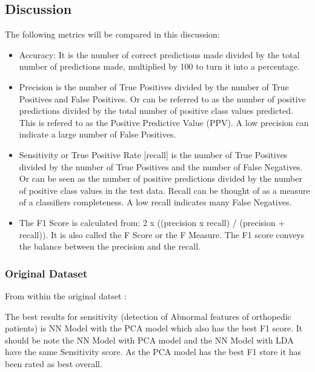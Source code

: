 \documentclass[
]{article}
\begin{document}
\newpage

\hypertarget{discussion}{%
\subsection{Discussion}\label{discussion}}

The following metrics will be compared in this discussion:

\begin{itemize}
\item
  Accuracy: It is the number of correct predictions made divided by the
  total number of predictions made, multiplied by 100 to turn it into a
  percentage.
\item
  Precision is the number of True Positives divided by the number of
  True Positives and False Positives. Or can be referred to as the
  number of positive predictions divided by the total number of positive
  class values predicted. This is refered to as the Positive Predictive
  Value (PPV). A low precision can indicate a large number of False
  Positives.
\item
  Sensitivity or True Positive Rate {[}recall{]} is the number of True
  Positives divided by the number of True Positives and the number of
  False Negatives. Or can be seen as the number of positive predictions
  divided by the number of positive class values in the test data.
  Recall can be thought of as a measure of a classifiers completeness. A
  low recall indicates many False Negatives.
\item
  The F1 Score is calculated from: 2 x ((precision x recall) /
  (precision + recall)). It is also called the F Score or the F Measure.
  The F1 score conveys the balance between the precision and the recall.
\end{itemize}

\hypertarget{original-dataset-8}{%
\subsubsection{Original Dataset}\label{original-dataset-8}}

From within the original datset :

The best results for sensitivity (detection of Abnormal features of
orthopedic patients) is NN Model with the PCA model which also has the
best F1 score. It should be note the NN Model with PCA model and the NN
Model with LDA have the same Sensitivity score. As the PCA model has the
best F1 store it has been rated as best overall.
\end{document}
